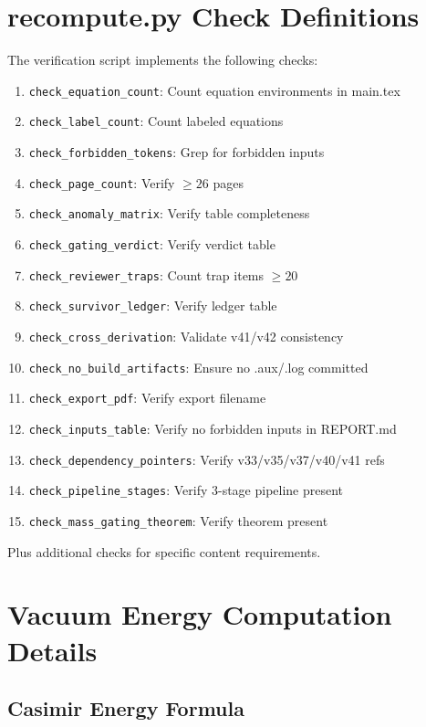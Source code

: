 \documentclass[11pt,a4paper]{article}
\begin{document}
\section{recompute.py Check Definitions}
\label{app:checks}

The verification script implements the following checks:

\begin{enumerate}
    \item \texttt{check\_equation\_count}: Count equation environments in main.tex
    \item \texttt{check\_label\_count}: Count labeled equations
    \item \texttt{check\_forbidden\_tokens}: Grep for forbidden inputs
    \item \texttt{check\_page\_count}: Verify $\geq 26$ pages
    \item \texttt{check\_anomaly\_matrix}: Verify table completeness
    \item \texttt{check\_gating\_verdict}: Verify verdict table
    \item \texttt{check\_reviewer\_traps}: Count trap items $\geq 20$
    \item \texttt{check\_survivor\_ledger}: Verify ledger table
    \item \texttt{check\_cross\_derivation}: Validate v41/v42 consistency
    \item \texttt{check\_no\_build\_artifacts}: Ensure no .aux/.log committed
    \item \texttt{check\_export\_pdf}: Verify export filename
    \item \texttt{check\_inputs\_table}: Verify no forbidden inputs in REPORT.md
    \item \texttt{check\_dependency\_pointers}: Verify v33/v35/v37/v40/v41 refs
    \item \texttt{check\_pipeline\_stages}: Verify 3-stage pipeline present
    \item \texttt{check\_mass\_gating\_theorem}: Verify theorem present
\end{enumerate}

Plus additional checks for specific content requirements.

\section{Vacuum Energy Computation Details}
\label{app:vac-energy}

\subsection{Casimir Energy Formula}
\end{document}
